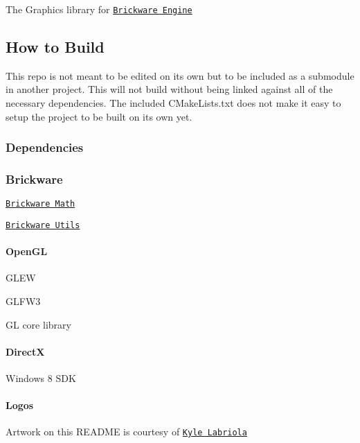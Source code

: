  

The Graphics library for \href{http://github.com/Honeybunch/Brickware-Engine}{\tt Brickware Engine} 



\subsection*{How to Build}

This repo is not meant to be edited on its own but to be included as a submodule in another project. This will not build without being linked against all of the necessary dependencies. The included C\+Make\+Lists.\+txt does not make it easy to setup the project to be built on its own yet.

\subsubsection*{Dependencies}

\subsubsection*{Brickware}


\begin{DoxyItemize}
\item \href{http://github.com/Honeybunch/BrickwareMath}{\tt Brickware Math}
\item \href{http://github.com/Honeybunch/BrickwareUtils}{\tt Brickware Utils}
\end{DoxyItemize}

\paragraph*{Open\+G\+L}


\begin{DoxyItemize}
\item G\+L\+E\+W
\item G\+L\+F\+W3
\item G\+L core library
\end{DoxyItemize}

\paragraph*{Direct\+X}


\begin{DoxyItemize}
\item Windows 8 S\+D\+K
\end{DoxyItemize}

\paragraph*{Logos}

Artwork on this R\+E\+A\+D\+M\+E is courtesy of \href{http://www.kylelabriola.com/}{\tt Kyle Labriola} 